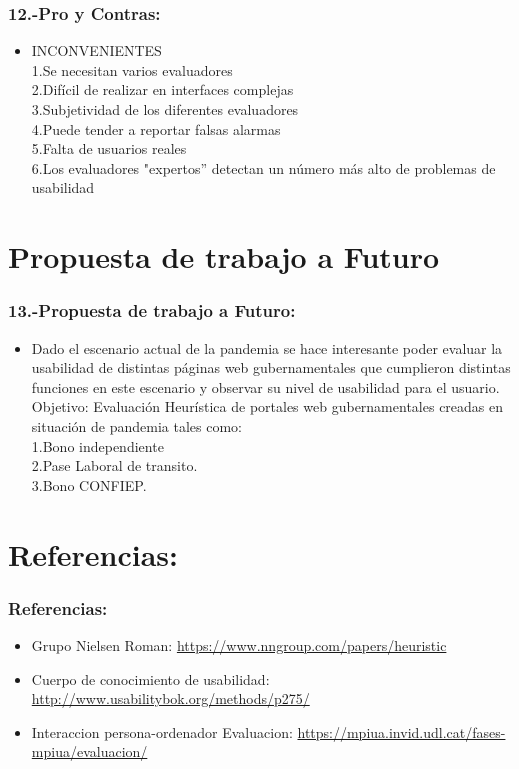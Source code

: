 \documentclass[11pt]{beamer}
\begin{document}
\begin{frame}
\frametitle{12.-Pro y Contras:}

\begin{itemize}
\item INCONVENIENTES\\ 1.Se necesitan varios evaluadores\\ 2.Difícil de realizar en interfaces complejas \\ 3.Subjetividad de los diferentes evaluadores \\ 4.Puede tender a reportar falsas alarmas \\ 5.Falta de usuarios reales\\ 6.Los evaluadores "expertos” detectan un número más alto de problemas de usabilidad
\end{itemize}
\end{frame}

\section{Propuesta de trabajo a Futuro}
\begin{frame}
\frametitle{13.-Propuesta de trabajo a Futuro:}

\begin{itemize}
\item Dado el escenario actual de la pandemia se hace interesante poder  evaluar la usabilidad de distintas páginas web gubernamentales que cumplieron distintas funciones en este escenario y observar su nivel de usabilidad para el usuario.
Objetivo: Evaluación Heurística de portales web gubernamentales creadas en situación de pandemia tales como: \\ 1.Bono independiente\\ 2.Pase Laboral de transito.\\ 3.Bono CONFIEP.
\end{itemize}
\end{frame}

\section{Referencias:}
\begin{frame}
\frametitle{Referencias:}
\begin{itemize}
\item Grupo Nielsen Roman: \url{https://www.nngroup.com/papers/heuristic}
\item Cuerpo de conocimiento de usabilidad: \url{http://www.usabilitybok.org/methods/p275/}
\item Interaccion persona-ordenador Evaluacion: \url{https://mpiua.invid.udl.cat/fases-mpiua/evaluacion/}
\end{itemize}
\end{frame}
\end{document}
